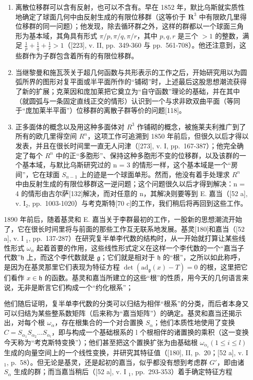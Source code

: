 \begin{enumerate}
\def\labelenumi{\arabic{enumi}.}
\setcounter{enumi}{1}
\item
  离散位移群可以含有反射，也可以不含有。早在 1852 年，默比乌斯就实质性地确定了球面几何中由反射生成的有限位移群（这等价于 \(\mathbf{R}^3\) 中有限欧几里得位移群的同一问题）；他发现，除去循环群之外，这样的群都以一个球面三角形为基本域，其角具有形式 \(\pi / p, \pi / q, \pi / r\)，其中 \(p, q, r\) 是三个 \(>1\) 的整数，满足 \(\frac{1}{p} + \frac{1}{q} + \frac{1}{r} > 1\)（{[}223{]}, v. II, pp.~349-360 与 pp.~561-708）。他还注意到，这些群作为子群包含着所有的有限位移群。
\item
  当继黎曼和施瓦茨关于超几何函数与共形表示的工作之后，开始研究用以为圆弧所界的图形对复平面或半平面所作的“铺砌”时，上述最后这股思想潮流获得了新的扩展；克莱因和庞加莱把它奠立为“自守函数”理论的基础，并在其中（就圆弧与一条固定直线正交的情形）认识到一个与求非欧双曲平面（等同于“庞加莱半平面”）位移群的离散子群等价的问题{[}118{]}。
\item
  正多面体的概念以及用这种多面体对 \(R^{3}\) 作铺砌的概念，被施莱夫利推广到了所有的欧几里得空间 \(R^{n}\)，这项工作可追溯到 1850 年前后，但很久以后才得以发表，并且在很长时间里一直无人问津（{[}273{]}, v. I, pp.~167-387）；他完全确定了每个 \(R^{n}\) 中的正“多胞形”、保持这种多胞形不变的位移群，以及该群的一个基本域，与默比乌斯研究过的 n = 3 的情形一样，这个基本域是一个“房间”，它在球面 \(S_{n-1}\) 上的迹是一个球面单形。然而，他没有着手处理求 \(R^{n}\) 中由反射生成的有限位移群这一逆问题；这个问题很久以后才得到解决：n = 4 的情形由古尔萨{[}132{]}解决，而对任意的 n，其解决则要等到 E. 嘉当（{[}52 a{]}, v. I₂, pp.~1003-1020）与考克斯特{[}70 c{]}的工作，我们稍后将再回到这些工作。
\end{enumerate}

1890 年前后，随着基灵和 E. 嘉当关于李群最初的工作，一股新的思想潮流开始了，它在很长时间里将与前面的那些工作互无联系地发展。基灵{[}180{]}和嘉当（{[}52 a{]}, v. I \(_{1}\), pp.~137-287）在研究复半单李代数的结构时，从一开始就打算让某些线性形式 \(\omega_{\alpha}\) 起着首要的作用，这些线性形式定义在这样一个李代数的一个“嘉当子代数”\(\mathfrak{h}\) 上，而这个李代数就是 \(\mathfrak{g}\)；它们就是相对于 \(\mathfrak{h}\) 的“根”，之所以如此称呼，是因为在基灵那里它们表现为特征方程 \(\det(\mathrm{ad}_{\mathfrak{g}}(x) - T) = 0\) 的根，这里把它们看作 \(x \in \mathfrak{h}\) 的函数。基灵和嘉当所建立的这些“根”的性质，用今天的几何语言来说，无非是断言它们构成一个“约化根系”；

他们随后证明，复半单李代数的分类可以归结为相伴“根系”的分类，而后者本身又可以归结为某些整系数矩阵（后来称为“嘉当矩阵”）的确定。基灵和嘉当还揭示出，对每个根 \(\omega_{\alpha}\)，存在根集合的一个对合置换 \(S_{\alpha}\)；他们本质性地使用了变换 \(C = S_{\alpha_{1}}S_{\alpha_{2}} \ldots S_{\alpha_{l}}\)，即与构成一个基础根系的 l 个根相伴的诸置换的乘积（这一变换今天称为“考克斯特变换”）；他们甚至把这个置换扩张为由基础根 \(\omega_{\alpha_{i}}(1 \leq i \leq l)\) 生成的向量空间上的一个线性变换，并研究其特征值（{[}180{]}, II, p.~20；{[}52 a{]}, v. I \(_{1}\), p.~58）。但无论是基灵，还是起初的嘉当，似乎都没有想到考虑群 \(G'\)，即由诸 \(S_{\alpha}\) 生成的群；而当嘉当稍后（{[}52 a{]}, v. I \(_{1}\), pp.~293-353）着手确定特征方程


